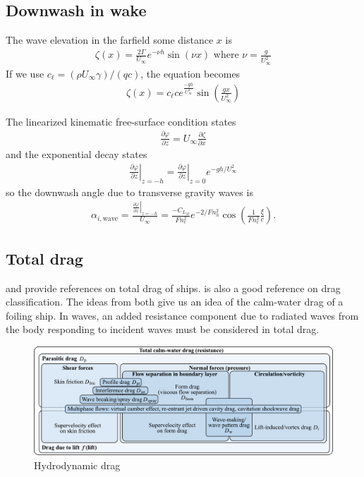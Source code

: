\documentclass[10pt]{article}
\newcommand{\pp}[2]{\frac{\partial #1}{\partial #2}}
\newcommand{\be}{\begin{eqnarray}}
\newcommand{\ee}{\end{eqnarray}}
\newcommand{\Uinf}{U_{\infty}}
\newcommand{\tn}[1]{\textrm{#1}}
\begin{document}
\subsection{Downwash in wake}
The wave elevation in the farfield some distance $x$ is
\be
\zeta(x) = \frac{2\Gamma}{\Uinf}e^{-\nu h} \sin(\nu x)
\tn{ where }
\nu = \frac{g}{\Uinf^2}
\ee
If we use $c_\ell = (\rho \Uinf \gamma) /\left(q c\right)$, the equation becomes
\be
\zeta(x) = c_\ell c e^{\frac{-gh}{\Uinf^2}} \sin\left(\frac{g x}{\Uinf^2}\right)
\ee

The linearized kinematic free-surface condition states
\be
\label{eqn:KFSBC}
\pp{\varphi}{z} =
\Uinf \pp{\zeta}{x}
\ee
and the exponential decay states
\be
\left. \pp{\varphi}{z} \right|_{z=-h} =
\left. \pp{\varphi}{z} \right|_{z=0} e^{-gh/\Uinf^2}
\ee
so the downwash angle due to transverse gravity waves is
\be
\alpha_{i,\tn{wave}} = \frac{ \left. \pp{\varphi}{z} \right|_{z=-h} }{\Uinf}
=
\frac{
-C_{L_M}
}{Fn_c^2} e^{{-2}/{Fn_h^2}}
\cos\left(
\frac{1}{Fn_c^2}\frac{\xi}{c}
\right).
\ee

\subsection{Total drag}

\citet[Fig. 21.3]{carlton2007} and \citet[Fig. 4]{Chernyshev2023} provide references on total drag of ships.
\citet[Fig. 12.2]{Raymer2012} is also a good reference on drag classification.
The ideas from both give us an idea of the calm-water drag of a foiling ship.
In waves, an added resistance component due to radiated waves from the body responding to incident waves must be considered in total drag.
\begin{figure}[htb!]
    \centering
    \includegraphics[width=\linewidth,clip,trim={0cm 0cm 0cm 0cm}]{modernDragBuildUp_v2.pdf}
    \caption{\label{fig:HydroDrag}Hydrodynamic drag}
\end{figure}
\clearpage
\end{document}
